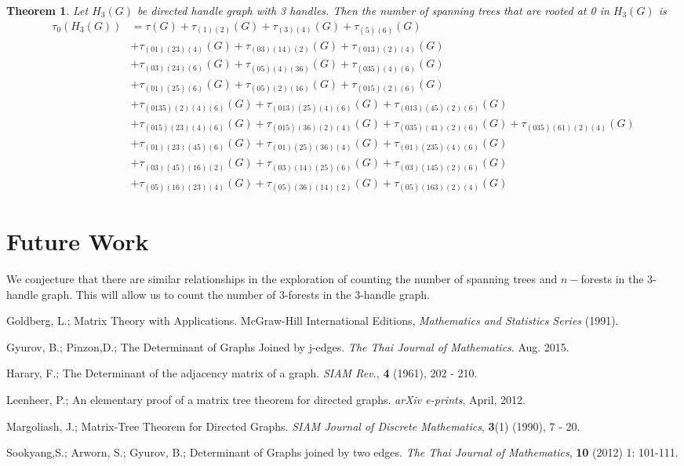 \documentclass[twoside,11pt]{article}
\newtheorem{theorem}{Theorem}[section]
\numberwithin{equation}{section} \DeclareMathOperator{\Var}{Var}
\newcommand{\bthm}{\begin{theorem}}
\newcommand{\ethm}{\end{theorem}}
\begin{document}
\bthm
Let $H_3(G)$ be directed handle graph with 3 handles. Then the number of spanning trees that are rooted at 0 in $H_3(G)$ is
\begin{equation*}
    \begin{split}
        \tau_0(H_3(G)) &= \tau(G) + \tau_{(1)(2)}(G)+ \tau_{(3)(4)}(G) + \tau_{(5)(6)}(G)\\ 
        &+ \tau_{(01)(23)(4)}(G) + \tau_{(03)(14)(2)}(G) + \tau_{(013)(2)(4)}(G)\\
        &+ \tau_{(03)(24)(6)}(G) + \tau_{(05)(4)(36)}(G) + \tau_{(035)(4)(6)}(G)\\
        &+ \tau_{(01)(25)(6)}(G) + \tau_{(05)(2)(16)}(G) + \tau_{(015)(2)(6)}(G)\\
        &+ \tau_{(0135)(2)(4)(6)}(G) + \tau_{(013)(25)(4)(6)}(G) + \tau_{(013)(45)(2)(6)}(G)\\
        &+ \tau_{(015)(23)(4)(6)}(G) + \tau_{(015)(36)(2)(4)}(G) + \tau_{(035)(41)(2)(6)}(G) + \tau_{(035)(61)(2)(4)}(G)\\
        &+ \tau_{(01)(23)(45)(6)}(G) + \tau_{(01)(25)(36)(4)}(G) + \tau_{(01)(235)(4)(6)}(G)\\
        &+ \tau_{(03)(45)(16)(2)}(G) + \tau_{(03)(14)(25)(6)}(G) + \tau_{(03)(145)(2)(6)}(G)\\
        &+ \tau_{(05)(16)(23)(4)}(G) + \tau_{(05)(36)(14)(2)}(G) + \tau_{(05)(163)(2)(4)}(G)
    \end{split}
\end{equation*}
\ethm

\section{Future Work}

We conjecture that there are similar relationships in the exploration of counting the number of spanning trees and $n-$forests in the 3-handle graph. This will allow us to count the number of 3-forests in the 3-handle graph.


\begin{thebibliography}{20}

 Goldberg, L.; Matrix Theory with Applications. McGraw-Hill International Editions, \emph{Mathematics and Statistics Series} (1991).

 Gyurov, B.; Pinzon,D.; The Determinant of Graphs Joined by j-edges. \emph{The Thai Journal of Mathematics}. Aug. 2015.

 Harary, F.; The Determinant of the adjacency matrix of a graph. \emph{SIAM Rev.}, \textbf{4} (1961), 202 - 210.

 Leenheer, P.; An elementary proof of a matrix tree theorem for directed graphs. \emph{arXiv e-prints}, April, 2012.

 Margoliash, J.;
Matrix-Tree Theorem for Directed Graphs.  \emph{SIAM Journal of Discrete Mathematics}, \textbf{3}(1) (1990), 7 - 20.

 Sookyang,S.; Arworn, S.; Gyurov, B.;  Determinant of Graphs joined by two edges. \emph{The Thai Journal of Mathematics}, \textbf{10} (2012) 1: 101-111.

\end{thebibliography}
\end{document}
